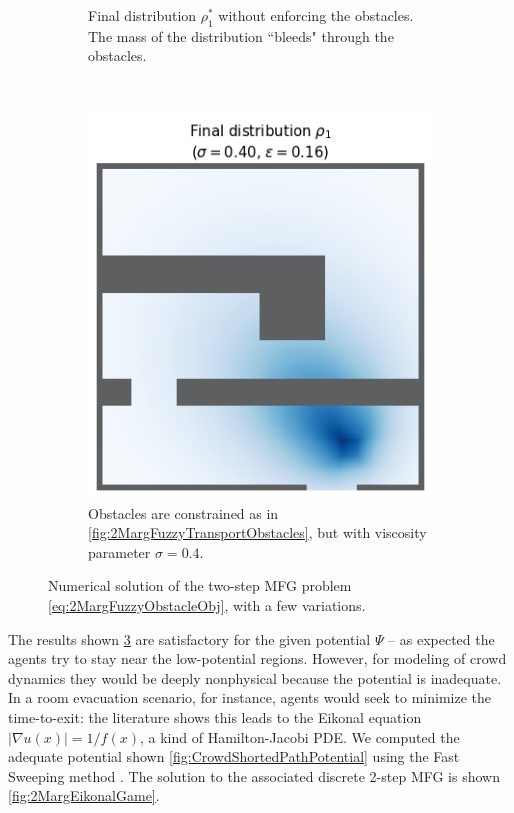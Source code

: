 \documentclass[../report.tex]{subfiles}
\begin{document}
\begin{figure}
\begin{subfigure}[t]{.4\linewidth}
	\caption{Final distribution $\rho^*_1$ without enforcing the obstacles. The mass of the distribution ``bleeds" through the obstacles. }\label{fig:2MargFuzzyTransportRelaxedObst}
	\end{subfigure}~
	\begin{subfigure}[t]{.4\linewidth}
	\centering
	\includegraphics[width=\linewidth]{../project/images/fuzzy_transport_lowvisc.png}
	\caption{Obstacles are constrained as in \cref{fig:2MargFuzzyTransportObstacles}, but with viscosity parameter $\sigma=0.4$.}\label{fig:2MargFuzzyTransportLowVisc}
	\end{subfigure}
	\caption{Numerical solution of the two-step MFG problem \eqref{eq:2MargFuzzyObstacleObj}, with a few variations.}\label{fig:2MargFuzzyTransportMarginals}
\end{figure}



\begin{remark}\label{rem:SmartPotential} The results shown \cref{fig:2MargFuzzyTransportMarginals} are satisfactory for the given potential $\Psi$ -- as expected the agents try to stay near the low-potential regions. However, for modeling of crowd dynamics they would be deeply nonphysical because the potential is inadequate. In a room evacuation scenario, for instance, agents would seek to minimize the time-to-exit: the literature shows this leads to the Eikonal equation $|\nabla u(x)| = 1/f(x)$, a kind of Hamilton-Jacobi PDE. We computed the adequate potential shown \cref{fig:CrowdShortedPathPotential} using the Fast Sweeping method \parencite{Zhao2004AFS}. The solution to the associated discrete 2-step MFG is shown \cref{fig:2MargEikonalGame}.
\end{remark}
\end{document}
